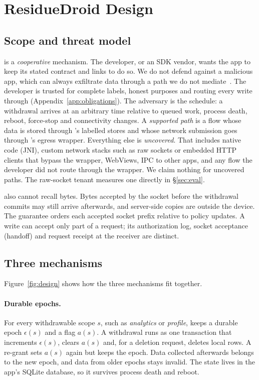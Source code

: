\section{ResidueDroid Design}
\label{sec:design}

\subsection{Scope and threat model}
\label{sec:scope}

\sys is a \emph{cooperative} mechanism. The developer, or an SDK vendor, wants the app to keep its stated contract and links
\sys to do so. We do not defend against a malicious app, which can always exfiltrate data through a path we do not
mediate~\cite{reardon2019fiftyways}. The developer is trusted for complete labels, honest purposes and routing every write
through \sys (Appendix~\ref{app:obligations}). The adversary is the schedule: a withdrawal arrives at an arbitrary time relative to queued
work, process death, reboot, force-stop and connectivity changes. A \emph{supported path} is a flow whose data is stored through
\sys's labelled stores and whose network submission goes through \sys's egress wrapper. Everything else is \emph{uncovered}.
That includes native code (JNI), custom network stacks such as raw sockets or embedded HTTP clients that bypass the wrapper,
WebViews, IPC to other apps, and any flow the developer did not route through the wrapper. We claim nothing for uncovered
paths. The raw-socket tenant measures one directly in \S\ref{sec:eval}.

\sys also cannot recall bytes. Bytes accepted by the socket before the withdrawal commits may still arrive afterwards, and
server-side copies are outside the device. The guarantee orders each accepted socket prefix relative to policy updates. A write can accept
only part of a request; its authorization log, socket acceptance (handoff) and request receipt at the receiver are distinct.

\subsection{Three mechanisms}

Figure~\ref{fig:design} shows how the three mechanisms fit together.


\paragraph{Durable epochs.} For every withdrawable scope $s$, such as \textit{analytics} or \textit{profile}, \sys keeps a
durable epoch $\epsilon(s)$ and a flag $a(s)$. A withdrawal runs as one transaction that increments $\epsilon(s)$, clears
$a(s)$ and, for a deletion request, deletes local rows. A re-grant sets $a(s)$ again but keeps the epoch. Data collected
afterwards belongs to the new epoch, and data from older epochs stays invalid. The state lives in the app's SQLite database, so
it survives process death and reboot.

